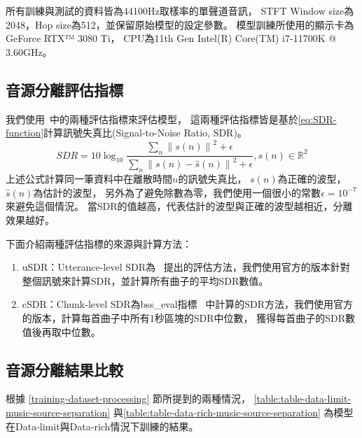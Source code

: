 \documentclass[class=NCU_thesis, crop=false]{standalone}
\begin{document}
所有訓練與測試的資料皆為44100Hz取樣率的單聲道音訊，
STFT Window size為2048，Hop size為512，並保留原始模型的設定參數。
模型訓練所使用的顯示卡為GeForce RTX™ 3080 Ti，
CPU為11th Gen Intel(R) Core(TM) i7-11700K @ 3.60GHz。

\subsection{音源分離評估指標}
我們使用~\cite{Luo_Yi2022MusicSourceSeparation}中的兩種評估指標來評估模型，
這兩種評估指標皆是基於\cref{eq:SDR-function}計算訊號失真比(Signal-to-Noise Ratio, SDR)。
\begin{equation}
    \label{eq:SDR-function}
    SDR = 10\log _{10}
    \frac{\sum _{n}\left\lVert s(n)\right\rVert^{2} + \epsilon }
    {\sum _{n}\left\lVert s(n)-\hat{s}(n) \right\rVert^{2} + \epsilon}, s(n)\in \mathbb{R}^{2}
\end{equation}
上述公式計算同一筆資料中在離散時間$n$的訊號失真比，
$s(n)$為正確的波型，$\hat{s}(n)$為估計的波型，
另外為了避免除數為零，我們使用一個很小的常數$\epsilon = 10^{-7}$來避免這個情況。
當SDR的值越高，代表估計的波型與正確的波型越相近，分離效果越好。

下面介紹兩種評估指標的來源與計算方法：
\begin{enumerate}
    \item uSDR：Utterance-level SDR為~\cite{Yuki_Mitsufuji2021MusicDemixing}
    提出的評估方法，我們使用官方的版本針對整個訊號來計算SDR，並計算所有曲子的平均SDR數值。
    \item cSDR：Chunk-level SDR為bss\_eval指標~\cite{Vincent2006Performance}
    中計算的SDR方法，我們使用官方的版本，計算每首曲子中所有1秒區塊的SDR中位數，
    獲得每首曲子的SDR數值後再取中位數。
\end{enumerate}



\subsection{音源分離結果比較}

根據 \ref{training-dataset-processing} 節所提到的兩種情況，
\cref{table:table-data-limit-music-source-separation}
與\cref{table:table-data-rich-music-source-separation}
為模型在Data-limit與Data-rich情況下訓練的結果。
\end{document}
